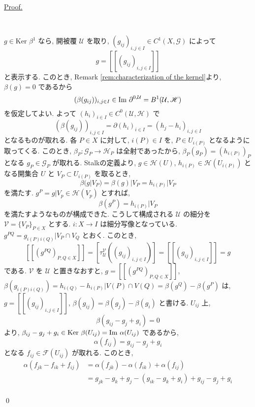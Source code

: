 \documentclass[a4paper,10pt,dvipdfmx]{jsreport}
\renewenvironment{proof}{\begin{flushleft} \underline{Proof.} \end{flushleft}\vspace{-1zh}\ }{\qed\\}
\renewcommand{\Im}[1]{{{\rm Im\ }{#1}}}
\renewcommand{\ker}{\textrm{Ker }}
\theoremstyle{definition}
\begin{document}
\begin{proof}
\begin{itemize}
            \(g \in \ker \beta^1\) なら, 開被覆 \(\mathcal{U}\) を取り, \((g_{ij})_{i,j \in I} \in C^1(X,\mathscr{G})\) によって
            \[
                g = [[(g_{ij})_{i,j \in I}]]
            \]
            と表示する. このとき, Remark \ref{rem:characterization of the kernel}より, \(\beta(g) = 0\) であるから
            \[
                (\beta(g_{ij}))_{i,j \in I} \in \Im \partial^{0,\mathcal{U}} = B^1(\mathcal{U},\mathscr{H})
            \]
            を仮定してよい. よって \((h_i)_{i\in I} \in C^0(\mathcal{U},\mathscr{H})\) で
            \[
                (\beta(g_{ij}))_{i,j \in I} = \partial (h_i)_{i\in I} = (h_j - h_i)_{i,j\in I}
            \]
            となるものが取れる. 各 \(P\in X\) に対して, \(i(P) \in I\) を, \(P \in U_{i(P)}\) となるように取ってくる. このとき, \(\beta_P \colon \mathscr{G}_P \to \mathscr{H}_P\) は全射であったから, \(\beta_P(g_P) = (h_{i(P)})_P\) となる \(g_P \in \mathscr{G}_P\) が取れる. Stalkの定義より, \(g \in \mathscr{H}(U)\), \(h_{i(P)} \in \mathscr{H}(U_{i(P)})\) となる開集合 \(U\) と \(V_P \subset U_{i(P)}\) を取るとき,
            \[
                \beta(g|V_P) = \beta(g)|V_P = h_{i(P)}|V_P
            \]
            を満たす. \(g^P = g|V_p \in \mathscr{H}(V_p)\) とすれば,
            \[
                \beta(g^P) = h_{i(P)}|V_P
            \]
            を満たすようなものが構成できた. こうして構成される \(\mathcal{U}\) の細分を \(\mathcal{V} = \{V_P\}_{P\in X}\) とする. \(i\colon X \to I\) は細分写像となっている. \(g^{PQ} = g_{i(P)i(Q)}|V_P\cap V_Q\) とおく. このとき,
            \[
                [[(g^{PQ})_{P,Q\in X}]] = [\tau_{\mathcal{U}}^{\mathcal{V}}((g_{ij})_{i,j\in I})] = [[(g_{ij})_{i,j\in I}]] =g
            \]
            である. \(\mathcal{V}\) を \(\mathcal{U}\) と置きなおすと, \(g = [[(g^{PQ})_{P,Q\in X}]]\), \(\beta(g_{i(P)i(Q)}) = h_{i(Q)} - h_{i(P)}|V(P) \cap V(Q) = \beta(g^Q)-\beta(g^P)\) は, \(g=[[(g_{ij})_{i,j \in I}]]\), \(\beta(g_{ij}) = \beta(g_j)-\beta(g_i)\) と書ける. \(U_{ij}\) 上, 
            \[
                \beta(g_{ij}-g_j +g_i) = 0
            \]
            より, \(\beta_{ij}-g_j + g_i \in \ker \beta(U_{ij}) = \Im \alpha(U_{ij})\) であるから,
            \[
                \alpha(f_{ij}) = g_{ij}-g_j + g_i
            \]
            となる \(f_{ij} \in \mathscr{F}(U_{ij})\) が取れる. このとき,
            \begin{align*}
                \alpha(f_{jk} -f_{ik} + f_{ij})
                &= \alpha(f_{jk}) -\alpha(f_{ik}) + \alpha(f_{ij})\\
                &= g_{jk}-g_k + g_j -(g_{ik}-g_k + g_i) +g_{ij}-g_j + g_i\\

\end{align*}
\end{itemize}
\end{proof}
\end{document}

